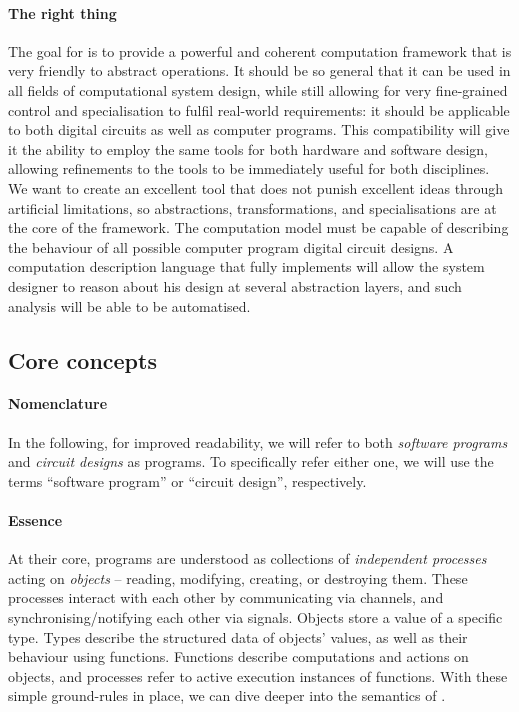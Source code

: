 \paragraph{The right thing}
The goal for {\tetra} is to provide a powerful and coherent computation framework that is very friendly to abstract operations.
It should be so general that it can be used in all fields of computational system design, while still allowing for very fine-grained control and specialisation to fulfil real-world requirements:
	it should be applicable to both digital circuits as well as computer programs.
This compatibility will give it the ability to employ the same tools for both hardware and software design, allowing refinements to the tools to be immediately useful for both disciplines.
We want to create an excellent tool that does not punish excellent ideas through artificial limitations, so abstractions, transformations, and specialisations are at the core of the framework.
The {\tetra} computation model must be capable of describing the behaviour of all possible computer program digital circuit designs.
A computation description language that fully implements {\tetra} will allow the system designer to reason about his design at several abstraction layers, and such analysis will be able to be automatised.

\subsection{Core concepts}
\paragraph{Nomenclature}
In the following, for improved readability, we will refer to both \emph{software programs} and \emph{circuit designs} as programs.
To specifically refer either one, we will use the terms ``software program'' or ``circuit design'', respectively.

\paragraph{Essence}
At their core, {\tetra} programs are understood as collections of \emph{independent processes} acting on \emph{objects} -- reading, modifying, creating, or destroying them.
These processes interact with each other by communicating via channels, and synchronising/notifying each other via signals.
Objects store a value of a specific type.
Types describe the structured data of objects' values, as well as their behaviour using functions.
Functions describe computations and actions on objects, and processes refer to active execution instances of functions.
With these simple ground-rules in place, we can dive deeper into the semantics of \tetra.
